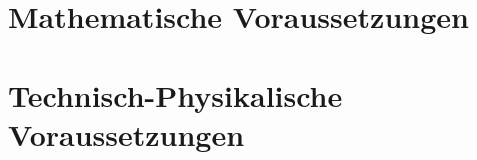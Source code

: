 \section[Mathematische Voraussetzungen]{Mathematische Voraussetzungen}

%
%
\section[Technische Voraussetzungen]{Technisch-Physikalische Voraussetzungen}
%

%
